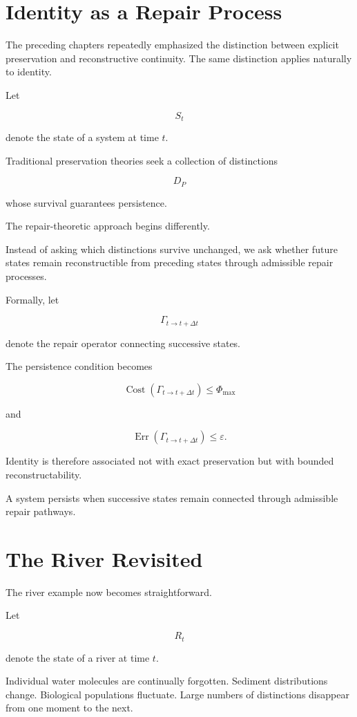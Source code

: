 \documentclass[12pt,oneside]{book}
\theoremstyle{plain} \newtheorem{theorem}{Theorem}[chapter] \newtheorem{lemma}[theorem]{Lemma} \newtheorem{proposition}[theorem]{Proposition} \newtheorem{corollary}[theorem]{Corollary}
\theoremstyle{definition} \newtheorem{definition}[theorem]{Definition} \newtheorem{axiom}[theorem]{Axiom} \newtheorem{construction}[theorem]{Construction}
\theoremstyle{remark} \newtheorem{remark}[theorem]{Remark} \newtheorem{example}[theorem]{Example}
\begin{document}
\section{Identity as a Repair Process}

The preceding chapters repeatedly emphasized the distinction between explicit preservation and reconstructive continuity. The same distinction applies naturally to identity.

Let

\[
S_t
\]

denote the state of a system at time $t$.

Traditional preservation theories seek a collection of distinctions

\[
D_P
\]

whose survival guarantees persistence.

The repair-theoretic approach begins differently.

Instead of asking which distinctions survive unchanged, we ask whether future states remain reconstructible from preceding states through admissible repair processes.

Formally, let

\[
\Gamma_{t\rightarrow t+\Delta t}
\]

denote the repair operator connecting successive states.

The persistence condition becomes

\[
\operatorname{Cost}(\Gamma_{t\rightarrow t+\Delta t})
\leq
\Phi_{\max}
\]

and

\[
\operatorname{Err}(\Gamma_{t\rightarrow t+\Delta t})
\leq
\varepsilon.
\]

Identity is therefore associated not with exact preservation but with bounded reconstructability.

A system persists when successive states remain connected through admissible repair pathways.

\section{The River Revisited}

The river example now becomes straightforward.

Let

\[
R_t
\]

denote the state of a river at time $t$.

Individual water molecules are continually forgotten. Sediment distributions change. Biological populations fluctuate. Large numbers of distinctions disappear from one moment to the next.
\end{document}
